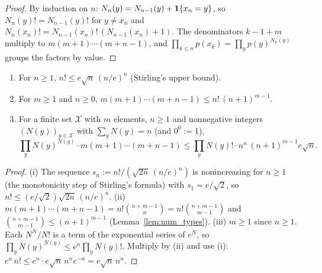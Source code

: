 \begin{proof}
\leanok
By induction on $n$: $N_n(y) = N_{n-1}(y) + \mathbf{1}\{x_n = y\}$, so $N_n(y)! = N_{n-1}(y)!$ for
$y \ne x_n$ and $N_n(x_n)! = N_{n-1}(x_n)!\,(N_{n-1}(x_n) + 1)$. The denominators $k - 1 + m$
multiply to $m (m + 1) \cdots (m + n - 1)$, and $\prod_{k \le n} p(x_k) = \prod_y p(y)^{N_n(y)}$
groups the factors by value.
\end{proof}

\begin{lemma}\label{lem:emp_factorial_bounds}
\leanok
{}
\begin{enumerate}
  \item[(i)] For $n \ge 1$, $n! \le e \sqrt n\, (n/e)^n$ (Stirling's upper bound).
  \item[(ii)] For $m \ge 1$ and $n \ge 0$, $m (m + 1) \cdots (m + n - 1) \le n!\, (n + 1)^{m - 1}$.
  \item[(iii)] For a finite set $\mathcal X$ with $m$ elements, $n \ge 1$ and nonnegative integers
        $(N(y))_{y \in \mathcal X}$ with $\sum_y N(y) = n$ (and $0^0 := 1$),
        \[
          \prod_y N(y)^{N(y)} \cdot m (m + 1) \cdots (m + n - 1)
          \le \prod_y N(y)! \cdot n^n\, (n + 1)^{m - 1} e \sqrt n .
        \]
\end{enumerate}
\end{lemma}

\begin{proof}
\leanok
{}
(i) The sequence $s_n := n!/(\sqrt{2n}\,(n/e)^n)$ is nonincreasing for $n \ge 1$ (the monotonicity
step of Stirling's formula) with $s_1 = e/\sqrt 2$, so $n! \le (e/\sqrt 2) \sqrt{2n}\,(n/e)^n$.
(ii) $m (m + 1) \cdots (m + n - 1) = n! \binom{n + m - 1}{n} = n! \binom{n + m - 1}{m - 1}$ and
$\binom{n + m - 1}{m - 1} \le (n + 1)^{m - 1}$ (Lemma~\ref{lem:num_types}).
(iii) $m \ge 1$ since $n \ge 1$. Each $N^N/N!$ is a term of the exponential series of $e^N$, so
$\prod_y N(y)^{N(y)} \le e^n \prod_y N(y)!$. Multiply by (ii) and use (i):
$e^n\, n! \le e^n \cdot e \sqrt n\, n^n e^{-n} = e \sqrt n\, n^n$.
\end{proof}

